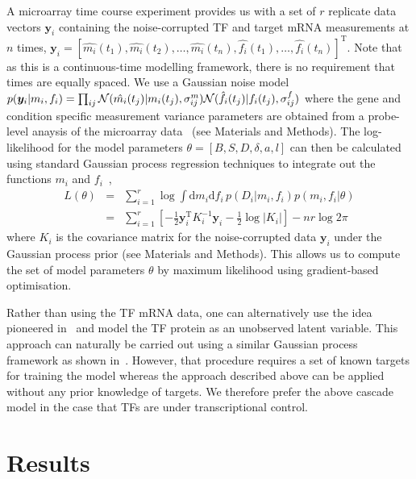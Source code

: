 \documentclass{pnastwo}
\begin{document}
\begin{article}
A microarray time course experiment provides us with a set of $r$
replicate data vectors $\bm y_i$ containing the noise-corrupted TF and target mRNA
measurements at $n$ times,
$\bm y_i=[\hat{m_i}(t_1),\hat{m_i}(t_2),\ldots,\hat{m_i}(t_n),\hat{f_i}(t_1),\ldots,\hat{f_i}(t_n)]^\mathrm{T}$. Note
that as this is a continuous-time modelling framework, there is no
requirement that times are equally spaced. We use a Gaussian noise model
$p(\bm y_i|m_i,f_i)=\prod_{ij}{\cal
  N}(\hat{m_i}(t_j)|m_i(t_j),\sigma^m_{ij}){\cal
  N}(\hat{f_i}(t_j)|f_i(t_j),\sigma^f_{ij})$ where the gene and condition
specific measurement variance parameters are obtained from a probe-level anaysis of the microarray data~\cite{Liu2005,Pearson2009} (see
Materials and Methods). The log-likelihood for the model parameters
$\theta=[B,S,D,\delta,a,l]$ can then be calculated using standard Gaussian process regression
techniques to integrate out the functions $m_i$ and $f_i$~\cite{Rasmussen2006},
\begin{eqnarray*}
L(\theta) & = & \sum_{i=1}^r \log \!\int \!\mathrm{d}m_i\mathrm{d}f_i\,
p(D_i|m_i,f_i)p(m_i,f_i|\theta)  \\
& = & \sum_{i=1}^r \left[-\frac{1}{2}\bm y_i^\mathrm{T} K_i^{-1} \bm y_i -
\frac{1}{2}\log|K_i|\right] -nr\log 2\pi
\end{eqnarray*}
where $K_i$ is the covariance matrix for the
noise-corrupted data $\bm y_i$ under the Gaussian process prior (see
Materials and Methods). This allows us to compute the set of model
parameters $\theta$ by maximum
likelihood using gradient-based optimisation. 

Rather than using the TF mRNA data, one can alternatively use the idea pioneered
in~\cite{Barenco2006a} and model the TF protein as an unobserved
latent variable. This approach can naturally be carried out using a
similar Gaussian process framework as shown in~\cite{Gao2008}. However, that procedure requires a set of known
targets for training the model whereas the approach described above
can be applied without any prior knowledge of targets. We therefore
prefer the above cascade model in the case that TFs are under
transcriptional control. 

\section{Results}


\end{article}
\end{document}
